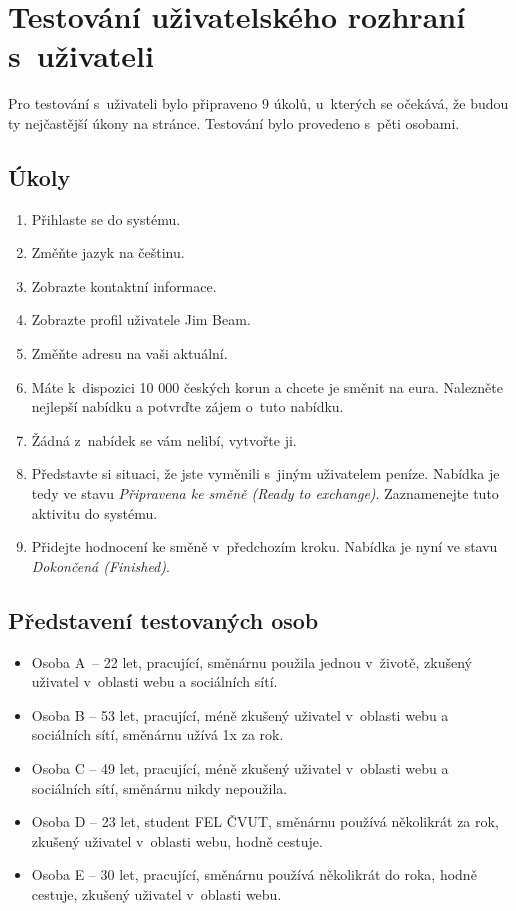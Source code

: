 \section{Testování uživatelského rozhraní s~uživateli}
\label{user-testing}
Pro testování s~uživateli bylo připraveno 9 úkolů, u~kterých se očekává, že budou ty nejčastější úkony na stránce. Testování bylo provedeno s~pěti osobami.
\subsection{Úkoly}

\begin{enumerate}
    \item Přihlaste se do systému.
    \item Změňte jazyk na češtinu.
    \item Zobrazte kontaktní informace.
    \item Zobrazte profil uživatele Jim Beam.
    \item Změňte adresu na vaši aktuální.
    \item Máte k~dispozici 10 000 českých korun a chcete je směnit na eura. Nalezněte nejlepší nabídku a potvrďte zájem o~tuto nabídku.
    \item Žádná z~nabídek se vám nelibí, vytvořte ji.
    \item Představte si situaci, že jste vyměnili s~jiným uživatelem peníze. Nabídka je tedy ve stavu \textit{Připravena ke směně (Ready to exchange)}. Zaznamenejte tuto aktivitu do systému.
    \item Přidejte hodnocení ke směně v~předchozím kroku. Nabídka je nyní ve stavu \textit{Dokončená (Finished)}.
\end{enumerate}

\subsection{Představení testovaných osob}

\begin{itemize}
    \item Osoba A~-- 22 let, pracující, směnárnu použila jednou v~životě, zkušený uživatel v~oblasti webu a sociálních sítí.
    \item Osoba B -- 53 let, pracující, méně zkušený uživatel v~oblasti webu a sociálních sítí, směnárnu užívá 1x za rok.
    \item Osoba C -- 49 let, pracující, méně zkušený uživatel v~oblasti webu a sociálních sítí, směnárnu nikdy nepoužila.
    \item Osoba D -- 23 let, student FEL ČVUT, směnárnu používá několikrát za rok, zkušený uživatel v~oblasti webu, hodně cestuje.
    \item Osoba E -- 30 let, pracující, směnárnu používá několikrát do roka, hodně cestuje, zkušený uživatel v~oblasti webu.
\end{itemize}

